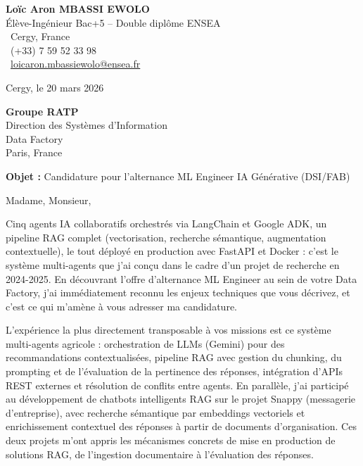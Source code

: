 \documentclass[a4paper,11pt]{article}
\begin{document}
\noindent
\begin{minipage}[t]{0.5\textwidth}
    \textbf{Loïc Aron MBASSI EWOLO}\\
    Élève-Ingénieur Bac+5 -- Double diplôme ENSEA\\[3pt]
    \faMapMarker\ Cergy, France\\
    \faPhone\ (+33) 7 59 52 33 98\\
    \faEnvelope\ \href{mailto:loicaron.mbassiewolo@ensea.fr}{loicaron.mbassiewolo@ensea.fr}
\end{minipage}
\hfill
\begin{minipage}[t]{0.4\textwidth}
    \raggedleft
    Cergy, le 20 mars 2026
\end{minipage}

\vspace{1.2cm}

\hfill
\begin{minipage}[t]{0.5\textwidth}
    \raggedleft
    \textbf{Groupe RATP}\\
    Direction des Systèmes d'Information\\
    Data Factory\\
    Paris, France
\end{minipage}

\vspace{1cm}

\noindent\textbf{Objet :} Candidature pour l'alternance ML Engineer IA Générative (DSI/FAB)

\vspace{0.8cm}

Madame, Monsieur,

Cinq agents IA collaboratifs orchestrés via LangChain et Google ADK, un pipeline RAG complet (vectorisation, recherche sémantique, augmentation contextuelle), le tout déployé en production avec FastAPI et Docker : c'est le système multi-agents que j'ai conçu dans le cadre d'un projet de recherche en 2024-2025. En découvrant l'offre d'alternance ML Engineer au sein de votre Data Factory, j'ai immédiatement reconnu les enjeux techniques que vous décrivez, et c'est ce qui m'amène à vous adresser ma candidature.

L'expérience la plus directement transposable à vos missions est ce système multi-agents agricole : orchestration de LLMs (Gemini) pour des recommandations contextualisées, pipeline RAG avec gestion du chunking, du prompting et de l'évaluation de la pertinence des réponses, intégration d'APIs REST externes et résolution de conflits entre agents. En parallèle, j'ai participé au développement de chatbots intelligents RAG sur le projet Snappy (messagerie d'entreprise), avec recherche sémantique par embeddings vectoriels et enrichissement contextuel des réponses à partir de documents d'organisation. Ces deux projets m'ont appris les mécanismes concrets de mise en production de solutions RAG, de l'ingestion documentaire à l'évaluation des réponses.
\end{document}
